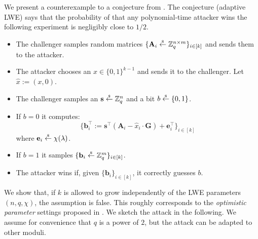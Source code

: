 \documentclass{theoretics}
\newcommand{\getsr}{\overset{\raisebox{-1pt}{$\scriptscriptstyle \$$}}{\gets}}
\newcommand{\sample}{\getsr}
\newcommand{\Z}{\mathbb{Z}}
\begin{document}
We present a counterexample to a conjecture from \cite{FOCS:QuaWeeWic18}. The conjecture (adaptive LWE) says that the probability of that any polynomial-time attacker wins the following experiment is negligibly close to $1/2$.
\begin{itemize}
    \item The challenger samples random matrices $\{\mathbf{A}_i \sample \Z_q^{n\times m} \}_{i\in[k]}$ and sends them to the attacker.
    \item The attacker chooses an $x\in\{0,1\}^{k-1}$ and sends it to the challenger. Let $\hat{x} := (x, 0)$.
    \item The challenger samples an $\mathbf{s}\sample\Z_q^n$ and a bit $b\sample\{0,1\}$.
    \item If $b =0$ it computes:
    \[
    \{\mathbf{b}_i^\intercal := \mathbf{s}^\intercal(\mathbf{A}_i - \hat{x}_i\cdot \mathbf{G}) + \mathbf{e}_i^\intercal\}_{i\in[k]}
    \]
    where $\mathbf{e}_i \sample \chi(\lambda)$.
    \item If $b =1$ it samples $\{\mathbf{b}_i \sample \Z_q^m\}_{i\in[k]}$.
    \item The attacker wins if, given $\{\mathbf{b}_i\}_{i\in[k]}$, it correctly guesses $b$.
\end{itemize}
We show that, if $k$ is allowed to grow independently of the LWE parameters $(n,q,\chi)$, the assumption is false. This roughly corresponds to the \emph{optimistic parameter} settings proposed in \cite{FOCS:QuaWeeWic18}. We sketch the attack in the following. We assume for convenience that $q$ is a power of $2$, but the attack can be adapted to other moduli.
\end{document}
